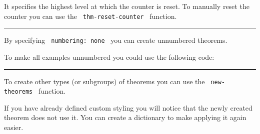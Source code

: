 \begin{Shaded}
\begin{Highlighting}[]
\end{Highlighting}
\end{Shaded}

It specifies the highest level at which the counter is reset. To
manually reset the counter you can use the
\texttt{\ thm-reset-counter\ } function.

\begin{center}\rule{0.5\linewidth}{0.5pt}\end{center}

By specifying \texttt{\ numbering:\ none\ } you can create unnumbered
theorems.

\begin{Shaded}
\begin{Highlighting}[]
\NormalTok{\#example(numbering: none)[}
\NormalTok{]}
\end{Highlighting}
\end{Shaded}

To make all examples unnumbered you could use the following code:

\begin{Shaded}
\begin{Highlighting}[]
\end{Highlighting}
\end{Shaded}

\begin{center}\rule{0.5\linewidth}{0.5pt}\end{center}

To create other types (or subgroups) of theorems you can use the
\texttt{\ new-theorems\ } function.

\begin{Shaded}
\begin{Highlighting}[]
\end{Highlighting}
\end{Shaded}

If you have already defined custom styling you will notice that the
newly created theorem does not use it. You can create a dictionary to
make applying it again easier.

\begin{Shaded}
\begin{Highlighting}[]
\NormalTok{)}

\end{Highlighting}
\end{Shaded}

